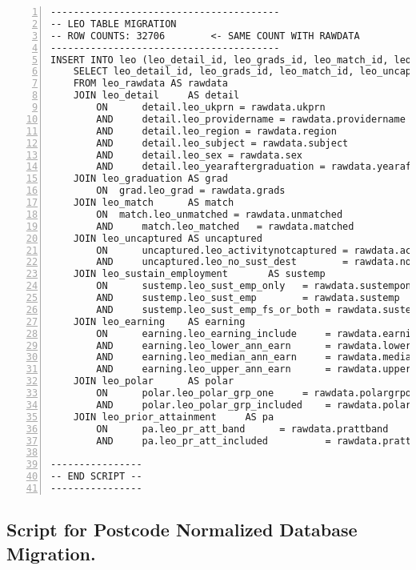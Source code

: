 \begin{lstlisting}[breaklines, frame=single, numbers=left, caption={PL/pgSQL's DML Script for Education Normalized Database Migration.}, label=commandline-02]
----------------------------------------
-- LEO TABLE MIGRATION 
-- ROW COUNTS: 32706		<- SAME COUNT WITH RAWDATA
----------------------------------------
INSERT INTO leo (leo_detail_id, leo_grads_id, leo_match_id, leo_uncaptured_id, leo_sust_emp_id, leo_earning_id, leo_polar_id, leo_pr_att_id)
	SELECT leo_detail_id, leo_grads_id, leo_match_id, leo_uncaptured_id, leo_sust_emp_id, leo_earning_id, leo_polar_id, leo_pr_att_id
	FROM leo_rawdata AS rawdata
	JOIN leo_detail     AS detail 
		ON      detail.leo_ukprn = rawdata.ukprn 
		AND 	detail.leo_providername = rawdata.providername
		AND 	detail.leo_region = rawdata.region
		AND 	detail.leo_subject = rawdata.subject
		AND 	detail.leo_sex = rawdata.sex
		AND 	detail.leo_yearaftergraduation = rawdata.yearaftergraduation
	JOIN leo_graduation AS grad 
		ON 	grad.leo_grad = rawdata.grads
	JOIN leo_match	    AS match 
		ON 	match.leo_unmatched = rawdata.unmatched
		AND    	match.leo_matched   = rawdata.matched
	JOIN leo_uncaptured AS uncaptured 
		ON      uncaptured.leo_activitynotcaptured = rawdata.activitynotcaptured
		AND     uncaptured.leo_no_sust_dest        = rawdata.nosustdest
	JOIN leo_sustain_employment       AS sustemp 
		ON      sustemp.leo_sust_emp_only 	= rawdata.sustemponly
		AND     sustemp.leo_sust_emp      	= rawdata.sustemp
		AND     sustemp.leo_sust_emp_fs_or_both = rawdata.sustempfsorboth
	JOIN leo_earning    AS earning 
		ON      earning.leo_earning_include 	= rawdata.earningsinclude
		AND     earning.leo_lower_ann_earn      = rawdata.lowerannearn
		AND     earning.leo_median_ann_earn     = rawdata.medianannearn
		AND     earning.leo_upper_ann_earn      = rawdata.upperannearn
	JOIN leo_polar      AS polar 
		ON      polar.leo_polar_grp_one 	= rawdata.polargrpone
		AND     polar.leo_polar_grp_included    = rawdata.polargrponeincluded
	JOIN leo_prior_attainment     AS pa 
		ON      pa.leo_pr_att_band 		= rawdata.prattband
		AND     pa.leo_pr_att_included          = rawdata.prattincluded;

----------------
-- END SCRIPT -- 
----------------

\end{lstlisting}

\subsection{Script for Postcode Normalized Database Migration.}

